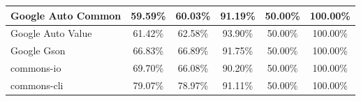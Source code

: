 \documentclass[conference,draftclsnofoot,onecolumn]{IEEEtran}
\begin{document}
\begin{table}[ht]
\begin{tabular}{|l|c|c|c|c|c|}
Google Auto Common            & 59.59\%                                                                                 & 60.03\%                                                                                     & 91.19\%                                                                              & 50.00\%                                                                               & 100.00\%                                                                             \\ \hline
Google Auto Value             & 61.42\%                                                                                 & 62.58\%                                                                                     & 93.90\%                                                                              & 50.00\%                                                                               & 100.00\%                                                                             \\ \hline
Google Gson                   & 66.83\%                                                                                 & 66.89\%                                                                                     & 91.75\%                                                                              & 50.00\%                                                                               & 100.00\%                                                                             \\ \hline
commons-io                    & 69.70\%                                                                                 & 66.08\%                                                                                     & 90.20\%                                                                              & 50.00\%                                                                               & 100.00\%                                                                             \\ \hline
commons-cli                   & 79.07\%                                                                                 & 78.97\%                                                                                     & 91.11\%                                                                              & 50.00\%                                                                               & 100.00\%                                                                             \\ \hline

\end{tabular}
\end{table}
\end{document}

